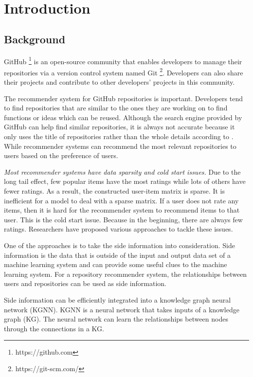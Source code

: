 \documentclass[11pt,twoside]{report}
\begin{document}
\chapter{Introduction}
\section{Background}
GitHub \footnote{https://github.com} is an open-source community that enables developers to manage their repositories via a version control system named Git \footnote{https://git-scm.com/}. Developers can also share their projects and contribute to other developers’ projects in this community.

The recommender system for GitHub repositories is important. Developers tend to find repositories that are similar to the ones they are working on to find functions or ideas which can be reused. Although the search engine provided by GitHub can help find similar repositories, it is always not accurate because it only uses the title of repositories rather than the whole details according to \cite{xu_repersp_2017}. While recommender systems can recommend the most relevant repositories to users based on the preference of users.

\textit{Most recommender systems have data sparsity and cold start issues.} Due to the long tail effect, few popular items have the most ratings while lots of others have fewer ratings. As a result, the constructed user-item matrix is sparse. It is inefficient for a model to deal with a sparse matrix. If a user does not rate any items, then it is hard for the recommender system to recommend items to that user. This is the cold start issue. Because in the beginning, there are always few ratings. Researchers have proposed various approaches to tackle these issues.

One of the approaches is to take the side information \cite{jonschkowski_patterns_2016} into consideration. Side information is the data that is outside of the input and output data set of a machine learning system and can provide some useful clues to the machine learning system. For a repository recommender system, the relationships between users and repositories can be used as side information.

Side information can be efficiently integrated into a knowledge graph neural network (KGNN). KGNN is a neural network that takes inputs of a knowledge graph (KG). The neural network can learn the relationships between nodes through the connections in a KG.
\end{document}

